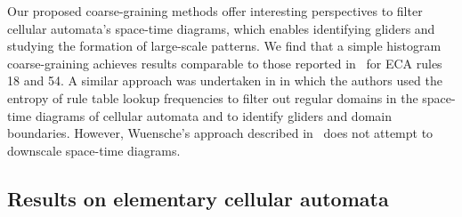 Our proposed coarse-graining methods offer interesting perspectives to filter
cellular automata's space-time diagrams, which enables identifying gliders and
studying the formation of large-scale patterns. We find that a simple histogram
coarse-graining achieves results comparable to those reported
in~\parencite{hansonAttractorbasinPortraitCellular1992,
  elorantaKinkCellularAutomaton1992, hansonComputationalMechanicsCellular1997,
  wuenscheExploringDiscreteDynamics2011} for ECA rules 18 and 54. A similar
approach was undertaken in \parencite{wuenscheClassifyingCellularAutomata1999} in
which the authors used the entropy of rule table lookup frequencies to filter
out regular domains in the space-time diagrams of cellular automata and to
identify gliders and domain boundaries. However, Wuensche's approach described
in~\parencite{wuenscheClassifyingCellularAutomata1999} does not attempt to downscale
space-time diagrams.

\subsection{Results on elementary cellular automata}

